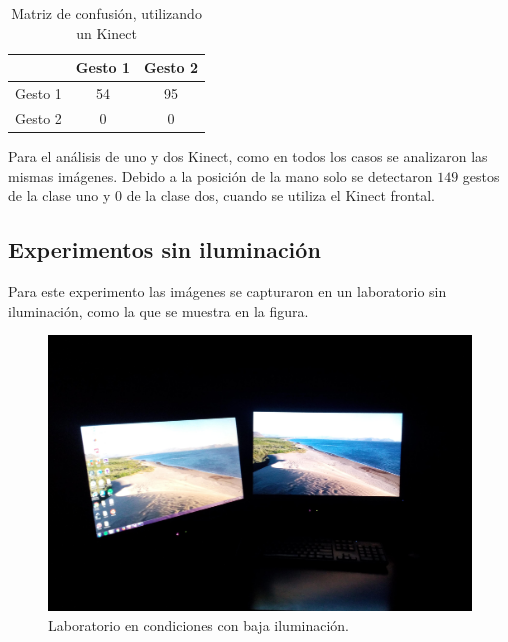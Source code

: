 \begin{table}[h!] 
\begin{center}
\begin{tabular}{ r || c | c |} 
 
        & Gesto 1 & Gesto 2 \\ \hline \hline  
Gesto 1 &  54    &   95    \\ \hline  
Gesto 2 &  0     &  0   \\   

\end{tabular}
\end{center} 
\caption{Matriz de confusión, utilizando un Kinect} 
\end{table}  

Para el análisis de uno y dos Kinect, como en todos los casos se analizaron las mismas imágenes. Debido a la posición de la mano solo se detectaron $149$ gestos de la clase uno y $0$ de la clase dos, cuando se utiliza el Kinect frontal.  


\subsection{Experimentos sin iluminación}
Para este experimento las imágenes se capturaron en un laboratorio sin iluminación, como la que se muestra en la figura.

\begin{figure}[h!]
\begin{center} 
\includegraphics[scale=0.09]{./Figures/noIluminacion.jpg}
\end{center}
\caption{Laboratorio en condiciones con baja iluminación.}
\label{fig:LabNoIluminado} 
\end{figure} 

